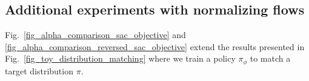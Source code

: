 \documentclass[letterpaper]{article} \usepackage{aaai20}  \usepackage{times}  \usepackage{helvet} \usepackage{courier}  \usepackage[hyphens]{url}  \usepackage{graphicx} \urlstyle{rm} \def\UrlFont{\rm}  \usepackage{graphicx}  \usepackage[section]{placeins}
\begin{document}
\subsection{Additional experiments with normalizing flows}

Fig.~\ref{fig_alpha_comparison_sac_objective} and \ref{fig_alpha_comparison_reversed_sac_objective} extend the results presented in Fig.~\ref{fig_toy_distribution_matching} where we train a policy $\pi_\phi$ to match a target distribution $\pi$.
\end{document}

